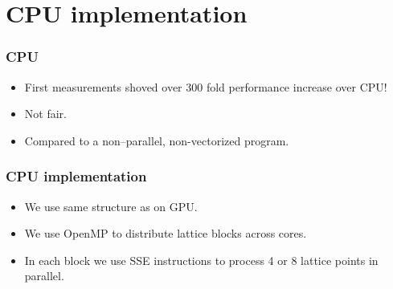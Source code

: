 \documentclass{beamer}
\newcommand{\fillblockgray}[2]{
\pgfmathtruncatemacro\llx{\bksize*(#1)-2}
\pgfmathtruncatemacro\lly{\bksize*(#2)-2}
\pgfmathtruncatemacro\urx{\bksize*(#1+1)+1}
\pgfmathtruncatemacro\ury{\bksize*(#2+1)+1}
\foreach \x in {\llx, ..., \urx}
  \foreach \y in {\lly,...,\ury} {
    \fill[craneorange] (\x, \y) circle(.25);
  }
}
\newcommand{\npartition}[3]{
\pgfmathtruncatemacro\row{Mod(#2,4)}
\ifnum \row = 0
   \pgfmathtruncatemacro\num{Mod(#1,4)}
\else \ifnum \row  = 1
   \pgfmathtruncatemacro\num{Mod(#1,4)+4}
\else \ifnum \row  = 2
   \pgfmathtruncatemacro\num{Mod(Mod(#1,4)+2,4)}
\else \ifnum \row  = 3
   \pgfmathtruncatemacro\num{Mod(Mod(#1,4)+2,4)+4}
\fi
\fi
\fi
\fi
\ifnum \num = #3
\fill[black] (#1, #2) circle(0.35);
\fi

}
\newcommand{\markpartition}[3]{
\pgfmathtruncatemacro\llx{\bksize*(#1)}
\pgfmathtruncatemacro\lly{\bksize*(#2)}
\pgfmathtruncatemacro\urx{\bksize*(#1+1)-1}
\pgfmathtruncatemacro\ury{\bksize*(#2+1)-1}
\foreach \x in {\llx, ..., \urx}
  \foreach \y in {\lly,...,\ury} {
    \npartition{\x}{\y}{#3}
  }
}
\def\bksize{8}
\def\bkcount{4}
\def\lcsize{5}
\begin{document}
\section{CPU implementation}

\begin{frame}
\frametitle{CPU}
\begin{itemize}
\item First measurements shoved over 300 fold  performance increase over CPU!
\item Not fair.
\item Compared to a non--parallel, non-vectorized program.
\end{itemize}
\end{frame}



\begin{frame}
\frametitle{CPU implementation}
\begin{itemize}
\item We use same structure as on GPU.
\item We use OpenMP to distribute lattice blocks across cores.
\item In each block we use SSE instructions to process 4 or 8 lattice points in parallel. 
\end{itemize}
\end{frame}

\begin{frame}

\end{frame}
\end{document}
